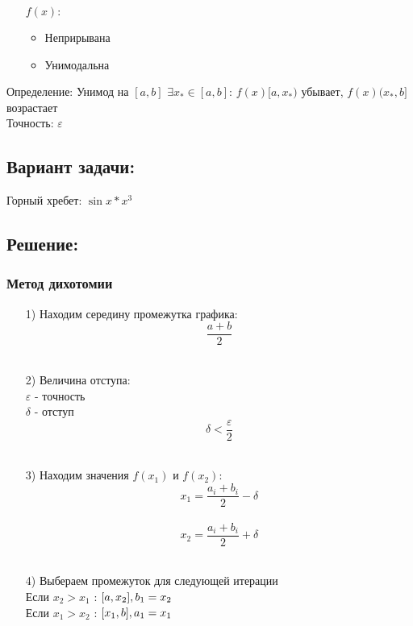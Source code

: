 \documentclass[fleqn]{article}
\begin{document}
\begin{itemize}
    \item [$f(x):$]
    \begin{itemize}
        \item Неприрывана
        \item Унимодальна
    \end{itemize}
\end{itemize}

Определение: Унимод на $[a, b]$  $ \exists x_* \in [a, b]$:  $f(x) [a,x_*)$ убывает, $f(x) (x_*, b]$  возрастает\\

Точность: $\varepsilon$

\subsection*{Вариант задачи:}
Горный хребет: $\sin{x}*x^3$

\subsection*{Решение:}
\subsubsection{Метод дихотомии}

\begin{itemize}
    \item[1)] Находим середину промежутка графика:\\
    $$\frac{a+b}{2}$$\\
    
    \item[2)] Величина отступа:\\
    $\varepsilon$ - точность\\
    $\delta$ - отступ\\
    $$\delta < \frac{\varepsilon}{2} $$\\
    
    \item[3)] Находим значения $f(x_1)$ и $f(x_2)$:\\
    $$x_1 = \frac{a_i+b_i}{2} - \delta$$\\
    $$x_2 = \frac{a_i+b_i}{2}+\delta$$\\
    
    \item[4)] Выбераем промежуток для следующей итерации\\
    Если $x_2>x_1$ : $[a, x_2],\space b_1=x_2$\\
    Если $x_1>x_2$ : $[x_1, b],\space a_1=x_1$\\
\end{itemize}
\end{document}
